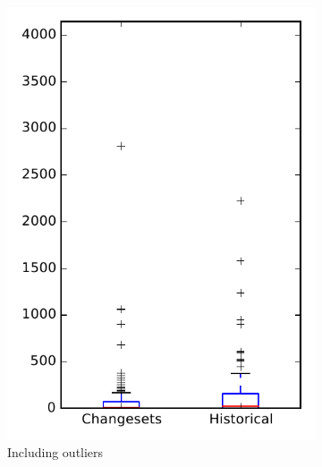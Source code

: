 
\begin{figure}
    \centering
    \begin{subfigure}{.4\textwidth}
        \centering
        \includegraphics[height=0.4\textheight]{figures/flt/rq2_openjpa}
        \caption{Including outliers}\label{fig:flt:rq2:openjpa_outlier}
    \end{subfigure}%
    \begin{subfigure}{.4\textwidth}
        \centering

\end{subfigure}
\end{figure}
